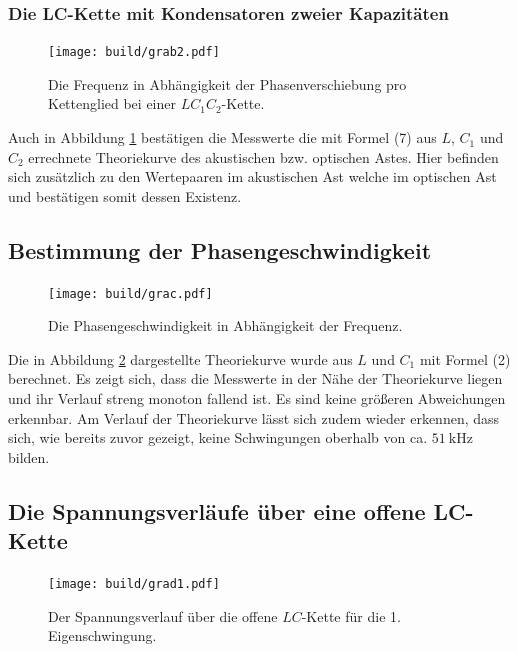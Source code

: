 \subsubsection{Die LC-Kette mit Kondensatoren zweier Kapazitäten}
\begin{figure}[H]
	\centering
	\caption{Die Frequenz in Abhängigkeit der Phasenverschiebung pro Kettenglied bei einer $LC_1C_2$-Kette.}
	\texttt{[image: build/grab2.pdf]}
	\label{fig:grab2}
\end{figure}

Auch in Abbildung \ref{fig:grab2} bestätigen die Messwerte die mit Formel (7) aus $L$, $C_1$ und $C_2$ errechnete Theoriekurve des akustischen bzw. optischen Astes. Hier befinden sich zusätzlich zu den Wertepaaren im akustischen Ast welche im optischen Ast und bestätigen somit dessen Existenz. 

\subsection{Bestimmung der Phasengeschwindigkeit}

\begin{figure}[H]
	\centering
	\caption{Die Phasengeschwindigkeit in Abhängigkeit der Frequenz.}
	\texttt{[image: build/grac.pdf]}
	\label{fig:grac}
\end{figure}

Die in Abbildung \ref{fig:grac} dargestellte Theoriekurve wurde aus $L$ und $C_1$ mit Formel (2) berechnet. 
Es zeigt sich, dass die Messwerte in der Nähe der Theoriekurve liegen und ihr Verlauf
 streng monoton fallend ist. Es sind keine größeren Abweichungen erkennbar. Am
  Verlauf der Theoriekurve lässt sich zudem wieder erkennen, dass sich, wie bereits zuvor
 gezeigt, keine Schwingungen oberhalb von ca. $\SI{51}{\kilo\hertz}$ bilden.

\subsection{Die Spannungsverläufe über eine offene LC-Kette}

\begin{figure}[H]
	\centering
	\caption{Der Spannungsverlauf über die offene $LC$-Kette für die 1. Eigenschwingung.}
	\texttt{[image: build/grad1.pdf]}
	\label{fig:grad1}
\end{figure}

